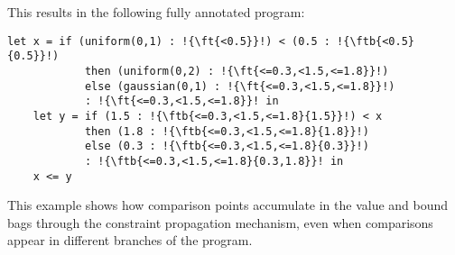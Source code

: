 This results in the following fully annotated program:

\begin{lstlisting}[aboveskip=1em,belowskip=1em,escapechar=!]
    let x = if (uniform(0,1) : !{\ft{<0.5}}!) < (0.5 : !{\ftb{<0.5}{0.5}}!)
            then (uniform(0,2) : !{\ft{<=0.3,<1.5,<=1.8}}!)
            else (gaussian(0,1) : !{\ft{<=0.3,<1.5,<=1.8}}!)
            : !{\ft{<=0.3,<1.5,<=1.8}}! in
    let y = if (1.5 : !{\ftb{<=0.3,<1.5,<=1.8}{1.5}}!) < x
            then (1.8 : !{\ftb{<=0.3,<1.5,<=1.8}{1.8}}!)
            else (0.3 : !{\ftb{<=0.3,<1.5,<=1.8}{0.3}}!)
            : !{\ftb{<=0.3,<1.5,<=1.8}{0.3,1.8}}! in
    x <= y
\end{lstlisting}

This example shows how comparison points accumulate in the value and bound bags through the constraint propagation mechanism, even when comparisons appear in different branches of the program.

